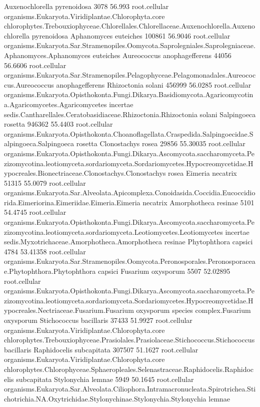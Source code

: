 \documentclass{article}
\begin{document}
\begin{Schunk}
\begin{Soutput}
 Auxenochlorella pyrenoidosa 		 3078 56.993 	 root.cellular organisms.Eukaryota.Viridiplantae.Chlorophyta.core chlorophytes.Trebouxiophyceae.Chlorellales.Chlorellaceae.Auxenochlorella.Auxenochlorella pyrenoidosa
 Aphanomyces euteiches 		 100861 56.9046 	 root.cellular organisms.Eukaryota.Sar.Stramenopiles.Oomycota.Saprolegniales.Saprolegniaceae.Aphanomyces.Aphanomyces euteiches
 Aureococcus anophagefferens 		 44056 56.6606 	 root.cellular organisms.Eukaryota.Sar.Stramenopiles.Pelagophyceae.Pelagomonadales.Aureococcus.Aureococcus anophagefferens
 Rhizoctonia solani 		 456999 56.0285 	 root.cellular organisms.Eukaryota.Opisthokonta.Fungi.Dikarya.Basidiomycota.Agaricomycotina.Agaricomycetes.Agaricomycetes incertae sedis.Cantharellales.Ceratobasidiaceae.Rhizoctonia.Rhizoctonia solani
 Salpingoeca rosetta 		 946362 55.4403 	 root.cellular organisms.Eukaryota.Opisthokonta.Choanoflagellata.Craspedida.Salpingoecidae.Salpingoeca.Salpingoeca rosetta
 Clonostachys rosea 		 29856 55.30035 	 root.cellular organisms.Eukaryota.Opisthokonta.Fungi.Dikarya.Ascomycota.saccharomyceta.Pezizomycotina.leotiomyceta.sordariomyceta.Sordariomycetes.Hypocreomycetidae.Hypocreales.Bionectriaceae.Clonostachys.Clonostachys rosea
 Eimeria necatrix 		 51315 55.0079 	 root.cellular organisms.Eukaryota.Sar.Alveolata.Apicomplexa.Conoidasida.Coccidia.Eucoccidiorida.Eimeriorina.Eimeriidae.Eimeria.Eimeria necatrix
 Amorphotheca resinae 		 5101 54.4745 	 root.cellular organisms.Eukaryota.Opisthokonta.Fungi.Dikarya.Ascomycota.saccharomyceta.Pezizomycotina.leotiomyceta.sordariomyceta.Leotiomycetes.Leotiomycetes incertae sedis.Myxotrichaceae.Amorphotheca.Amorphotheca resinae
 Phytophthora capsici 		 4784 53.41358 	 root.cellular organisms.Eukaryota.Sar.Stramenopiles.Oomycota.Peronosporales.Peronosporaceae.Phytophthora.Phytophthora capsici
 Fusarium oxysporum 		 5507 52.02895 	 root.cellular organisms.Eukaryota.Opisthokonta.Fungi.Dikarya.Ascomycota.saccharomyceta.Pezizomycotina.leotiomyceta.sordariomyceta.Sordariomycetes.Hypocreomycetidae.Hypocreales.Nectriaceae.Fusarium.Fusarium oxysporum species complex.Fusarium oxysporum
 Stichococcus bacillaris 		 37433 51.9927 	 root.cellular organisms.Eukaryota.Viridiplantae.Chlorophyta.core chlorophytes.Trebouxiophyceae.Prasiolales.Prasiolaceae.Stichococcus.Stichococcus bacillaris
 Raphidocelis subcapitata 		 307507 51.1627 	 root.cellular organisms.Eukaryota.Viridiplantae.Chlorophyta.core chlorophytes.Chlorophyceae.Sphaeropleales.Selenastraceae.Raphidocelis.Raphidocelis subcapitata
 Stylonychia lemnae 		 5949 50.1645 	 root.cellular organisms.Eukaryota.Sar.Alveolata.Ciliophora.Intramacronucleata.Spirotrichea.Stichotrichia.NA.Oxytrichidae.Stylonychinae.Stylonychia.Stylonychia lemnae

\end{Soutput}
\end{Schunk}
\end{document}
